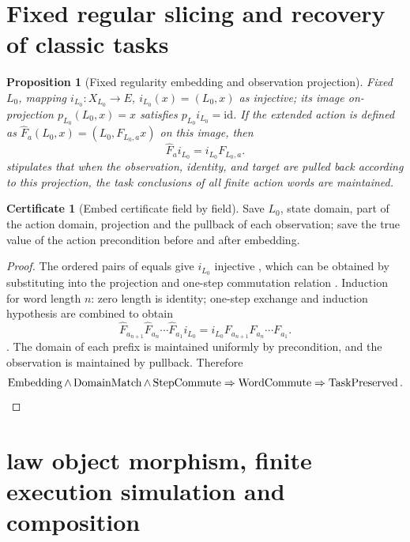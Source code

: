 \documentclass[12pt,a4paper,openany,notitlepage]{report}
\theoremstyle{plain}
\newtheorem{proposition}[theorem]{Proposition}
\theoremstyle{definition}
\newtheorem*{certificate}{Certificate}
\theoremstyle{remark}
\def\mathcal#1{#1}\def\mathsf#1{#1}\def\mathbb#1{#1}%
\begin{document}
\begin{CJK*}
\section { Fixed regular slicing and recovery of classic tasks }

\begin{proposition}
[Fixed regularity embedding and observation projection]\label{hgov:prop:slice}
Fixed $L_0$, mapping $i_{L_0}:X_{L_0}\to\mathcal E$, $i_{L_0}(x)=(L_0,x)$ as injective; its image on-projection $p_{L_0}(L_0,x)=x$ satisfies $p_{L_0}i_{L_0}=\mathrm{id}$. If the extended action is defined as $\widehat F_a(L_0,x)=(L_0,F_{L_0,a}x)$ on this image, then \[
\widehat F_ai_{L_0}=i_{L_0}F_{L_0,a}.
\] stipulates that when the observation, identity, and target are pulled back according to this projection, the task conclusions of all finite action words are maintained.\end{proposition}
\begin{certificate}
[Embed certificate field by field]Save $L_0$, state domain, part of the action domain, projection and the pullback of each observation; save the true value of the action precondition before and after embedding.\end{certificate}
\begin{proof}
The ordered pairs of equals give $i_{L_0}$ injective , which can be obtained by substituting into the projection and one-step commutation relation . Induction for word length $n$: zero length is identity; one-step exchange and induction hypothesis are combined to obtain \[
\widehat F_{a_{n+1}}\widehat F_{a_n}\cdots\widehat F_{a_1}i_{L_0}
=i_{L_0}F_{a_{n+1}}F_{a_n}\cdots F_{a_1}.
\]. The domain of each prefix is maintained uniformly by precondition, and the observation is maintained by pullback. Therefore \[
\operatorname{Embedding}\land\operatorname{DomainMatch}
\land\operatorname{StepCommute}
\Rightarrow\operatorname{WordCommute}
\Rightarrow\operatorname{TaskPreserved}.\qedhere
\]\end{proof}


\section { law object morphism, finite execution simulation and composition }


\end{CJK*}
\end{document}
